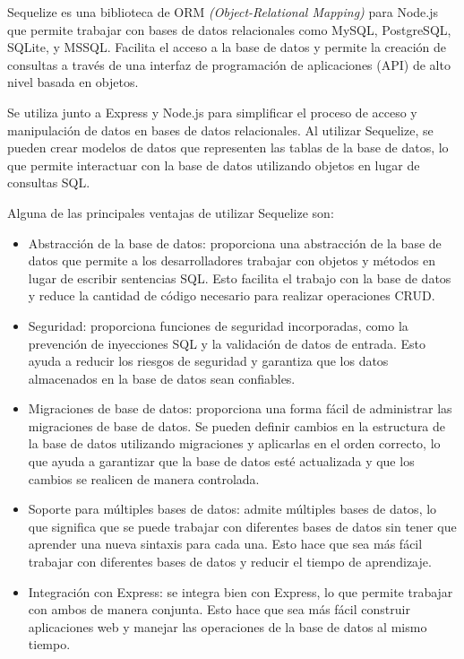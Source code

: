 Sequelize \cite{WEBSITE:sequelize} es una biblioteca de ORM \textit{(Object-Relational Mapping)} para Node.js que permite trabajar con bases de datos relacionales como MySQL, PostgreSQL, SQLite, y MSSQL. Facilita el acceso a la base de datos y permite la creación de consultas a través de una interfaz de programación de aplicaciones (API) de alto nivel basada en objetos.

Se utiliza junto a Express y Node.js para simplificar el proceso de acceso y manipulación de datos en bases de datos relacionales. Al utilizar Sequelize, se pueden crear modelos de datos que representen las tablas de la base de datos, lo que permite interactuar con la base de datos utilizando objetos en lugar de consultas SQL.

Alguna de las principales ventajas de utilizar Sequelize son:

\begin{itemize}
\item Abstracción de la base de datos: proporciona una abstracción de la base de datos que permite a los desarrolladores trabajar con objetos y métodos en lugar de escribir sentencias SQL. Esto facilita el trabajo con la base de datos y reduce la cantidad de código necesario para realizar operaciones CRUD.

\item Seguridad: proporciona funciones de seguridad incorporadas, como la prevención de inyecciones SQL y la validación de datos de entrada. Esto ayuda a reducir los riesgos de seguridad y garantiza que los datos almacenados en la base de datos sean confiables.

\item Migraciones de base de datos: proporciona una forma fácil de administrar las migraciones de base de datos. Se pueden definir cambios en la estructura de la base de datos utilizando migraciones y aplicarlas en el orden correcto, lo que ayuda a garantizar que la base de datos esté actualizada y que los cambios se realicen de manera controlada.

\item Soporte para múltiples bases de datos: admite múltiples bases de datos, lo que significa que se puede trabajar con diferentes bases de datos sin tener que aprender una nueva sintaxis para cada una. Esto hace que sea más fácil trabajar con diferentes bases de datos y reducir el tiempo de aprendizaje.

\item Integración con Express: se integra bien con Express, lo que permite trabajar con ambos de manera conjunta. Esto hace que sea más fácil construir aplicaciones web y manejar las operaciones de la base de datos al mismo tiempo.

\end{itemize}


